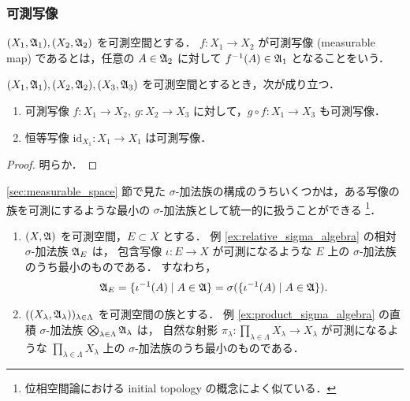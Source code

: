 \subsubsection{可測写像}

\begin{definition}
    $(X_1,\mathfrak{A}_1),(X_2,\mathfrak{A}_2)$ を可測空間とする．
    $f:X_1\to X_2$ が可測写像 (measurable map) であるとは，任意の $A\in\mathfrak{A}_2$ に対して $f^{-1}(A)\in\mathfrak{A}_1$ となることをいう．
\end{definition}

\begin{proposition}\label{prop:Meas_prop}
    $(X_1,\mathfrak{A}_1),(X_2,\mathfrak{A}_2),(X_3,\mathfrak{A}_3)$ を可測空間とするとき，次が成り立つ．
    \begin{enumerate}
        \item 可測写像 $f:X_1\to X_2,\ g:X_2\to X_3$ に対して，$g\circ f:X_1\to X_3$ も可測写像．
        \item 恒等写像 $\mathrm{id}_{X_1}:{X_1}\to{X_1}$ は可測写像．
    \end{enumerate}
\end{proposition}

\begin{proof}
    明らか．
\end{proof}

\begin{example}\label{ex:initial_sigma_algebra}
    \ref{sec:measurable_space} 節で見た $\sigma$-加法族の構成のうちいくつかは，ある写像の族を可測にするような最小の $\sigma$-加法族として統一的に扱うことができる
    \footnote{位相空間論における initial topology の概念によく似ている．}．
    \begin{enumerate}
        \item
            $(X,\mathfrak{A})$ を可測空間，$E\subset X$ とする．
            例 \ref{ex:relative_sigma_algebra} の相対 $\sigma$-加法族 $\mathfrak{A}_E$ は，
            包含写像 $\iota:E\to X$ が可測になるような $E$ 上の $\sigma$-加法族のうち最小のものである．
            すなわち，
            \begin{align*}
                \mathfrak{A}_E
                =\{\iota^{-1}(A)\mid A\in\mathfrak{A}\}
                =\sigma(\{\iota^{-1}(A)\mid A\in\mathfrak{A}\}).
            \end{align*}
        \item
            $((X_\lambda,\mathfrak{A}_\lambda))_{\lambda\in\Lambda}$ を可測空間の族とする．
            例 \ref{ex:product_sigma_algebra} の直積 $\sigma$-加法族 $\bigotimes_{\lambda\in\Lambda}\mathfrak{A}_\lambda$ は，
            自然な射影 $\pi_\lambda:\prod_{\lambda\in\Lambda}X_\lambda\to X_\lambda$ が可測になるような
            $\prod_{\lambda\in\Lambda}X_\lambda$ 上の $\sigma$-加法族のうち最小のものである．
        \end{enumerate}
\end{example}

